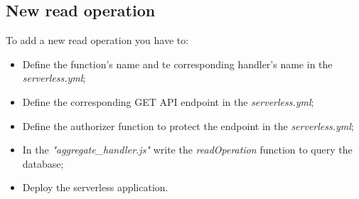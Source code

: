 \subsection{New read operation}
To add a new read operation you have to:
\begin{itemize}
	\item Define the function's name and te corresponding handler's name in the \emph{serverless.yml};
	\item Define the corresponding GET API endpoint in the \emph{serverless.yml};
	\item Define the authorizer function to protect the endpoint in the \emph{serverless.yml};
	\item In the \emph{"aggregate\_handler.js"} write the \emph{readOperation} function to query the database;
	\item Deploy the serverless application.
\end{itemize}